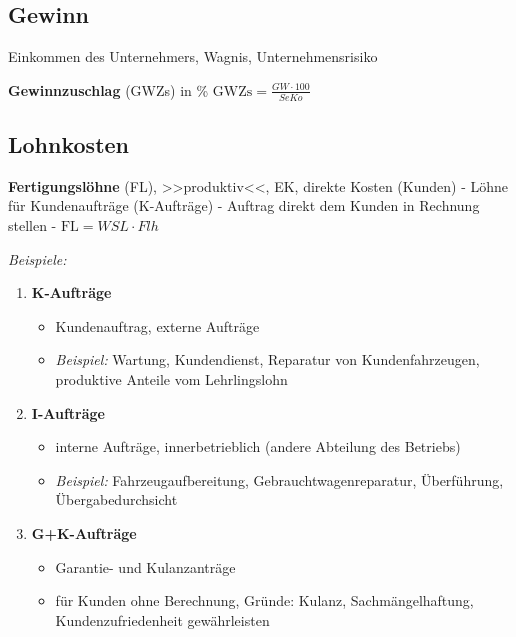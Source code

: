 \subsection{Gewinn}\label{gewinn}

Einkommen des Unternehmers, Wagnis, Unternehmensrisiko

\textbf{Gewinnzuschlag} (GWZs) in \%
$\boxed{\text{GWZs} = \frac{GW \cdot 100}{SeKo}}$

\newpage

\subsection{Lohnkosten}\label{lohnkosten}

\textbf{Fertigungslöhne} (FL), >>produktiv<<, EK, direkte Kosten
(Kunden) - Löhne für Kundenaufträge (K-Aufträge) - Auftrag direkt dem
Kunden in Rechnung stellen - $\boxed{\text{FL} = WSL \cdot Flh}$

\emph{Beispiele:}

\begin{enumerate}
\item
  \textbf{K-Aufträge}

  \begin{itemize}
  \item
    Kundenauftrag, externe Aufträge
  \item
    \emph{Beispiel:} Wartung, Kundendienst, Reparatur von
    Kundenfahrzeugen, produktive Anteile vom Lehrlingslohn
  \end{itemize}
\item
  \textbf{I-Aufträge}

  \begin{itemize}
  \item
    interne Aufträge, innerbetrieblich (andere Abteilung des Betriebs)
  \item
    \emph{Beispiel:} Fahrzeugaufbereitung, Gebrauchtwagenreparatur,
    Überführung, Übergabedurchsicht
  \end{itemize}
\item
  \textbf{G+K-Aufträge}

  \begin{itemize}
  \item
    Garantie- und Kulanzanträge
  \item
    für Kunden ohne Berechnung, Gründe: Kulanz, Sachmängelhaftung,
    Kundenzufriedenheit gewährleisten
  \end{itemize}
\end{enumerate}

